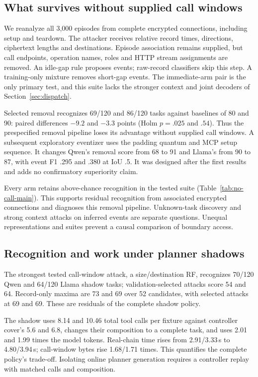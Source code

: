 \subsection{What survives without supplied call windows}\label{sec:noboundary}
We reanalyze all 3,000 episodes from complete encrypted connections, including setup and teardown. The attacker receives relative record times, directions, ciphertext lengths and destinations. Episode association remains supplied, but call endpoints, operation names, roles and HTTP stream assignments are removed. An idle-gap rule proposes events; raw-record classifiers skip this step. A training-only mixture removes short-gap events. The immediate-arm pair is the only primary test, and this suite lacks the stronger context and joint decoders of Section~\ref{sec:dispatch}.

Selected removal recognizes 69/120 and 86/120 tasks against baselines of 80 and 90: paired differences $-9.2$ and $-3.3$ points (Holm $p=.025$ and $.54$). Thus the prespecified removal pipeline loses its advantage without supplied call windows. A subsequent exploratory eventizer uses the padding quantum and MCP setup sequence. It changes Qwen's removal score from 68 to 91 and Llama's from 90 to 87, with event F1 .295 and .380 at IoU .5. It was designed after the first results and adds no confirmatory superiority claim.

Every arm retains above-chance recognition in the tested suite (Table~\ref{tab:no-call-main}). This supports residual recognition from associated encrypted connections and diagnoses this removal pipeline. Unknown-task discovery and strong context attacks on inferred events are separate questions. Unequal representations and suites prevent a causal comparison of boundary access.

\subsection{Recognition and work under planner shadows}\label{sec:shadow}
The strongest tested call-window attack, a size/destination RF, recognizes 70/120 Qwen and 64/120 Llama shadow tasks; validation-selected attacks score 54 and 64. Record-only maxima are 73 and 69 over 52 candidates, with selected attacks at 69 and 69. These are residuals of the complete shadow policy.

The shadow uses 8.14 and 10.46 total tool calls per fixture against controller cover's 5.6 and 6.8, changes their composition to a complete task, and uses 2.01 and 1.99 times the model tokens. Real-chain time rises from 2.91/3.33\,s to 4.80/3.94\,s; call-window bytes rise 1.68/1.71 times. This quantifies the complete policy's trade-off. Isolating online planner generation requires a controller replay with matched calls and composition.

